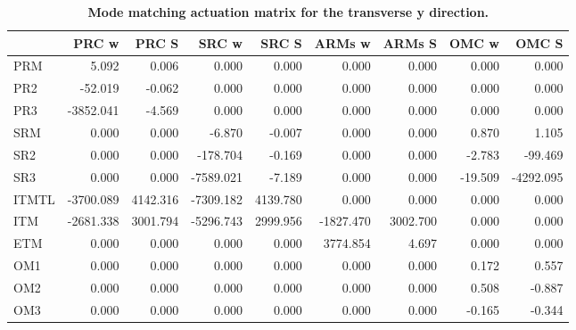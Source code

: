 \begin{table}
	\centering
	\begin{tabular}{|l||r|r|r|r|r|r|r|r|}
		\hline
		{} &     PRC w &    PRC S &     SRC w &    SRC S &    ARMs w &   ARMs S &   OMC w &     OMC S \\
		\hline
		\hline
PRM   &     5.092 &    0.006 &     0.000 &    0.000 &     0.000 &    0.000 &   0.000 &     0.000 \\
PR2   &   -52.019 &   -0.062 &     0.000 &    0.000 &     0.000 &    0.000 &   0.000 &     0.000 \\
PR3   & -3852.041 &   -4.569 &     0.000 &    0.000 &     0.000 &    0.000 &   0.000 &     0.000 \\
SRM   &     0.000 &    0.000 &    -6.870 &   -0.007 &     0.000 &    0.000 &   0.870 &     1.105 \\
SR2   &     0.000 &    0.000 &  -178.704 &   -0.169 &     0.000 &    0.000 &  -2.783 &   -99.469 \\
SR3   &     0.000 &    0.000 & -7589.021 &   -7.189 &     0.000 &    0.000 & -19.509 & -4292.095 \\
ITMTL & -3700.089 & 4142.316 & -7309.182 & 4139.780 &     0.000 &    0.000 &   0.000 &     0.000 \\
ITM   & -2681.338 & 3001.794 & -5296.743 & 2999.956 & -1827.470 & 3002.700 &   0.000 &     0.000 \\
ETM   &     0.000 &    0.000 &     0.000 &    0.000 &  3774.854 &    4.697 &   0.000 &     0.000 \\
OM1   &     0.000 &    0.000 &     0.000 &    0.000 &     0.000 &    0.000 &   0.172 &     0.557 \\
OM2   &     0.000 &    0.000 &     0.000 &    0.000 &     0.000 &    0.000 &   0.508 &    -0.887 \\
OM3   &     0.000 &    0.000 &     0.000 &    0.000 &     0.000 &    0.000 &  -0.165 &    -0.344 \\
	\hline
\end{tabular}
		\caption[Mode matching actuation matrix for the transverse y direction.]
{\textbf{Mode matching actuation matrix for the transverse y direction.} }
\label{tbl:y_act_matrix}
\end{table}

